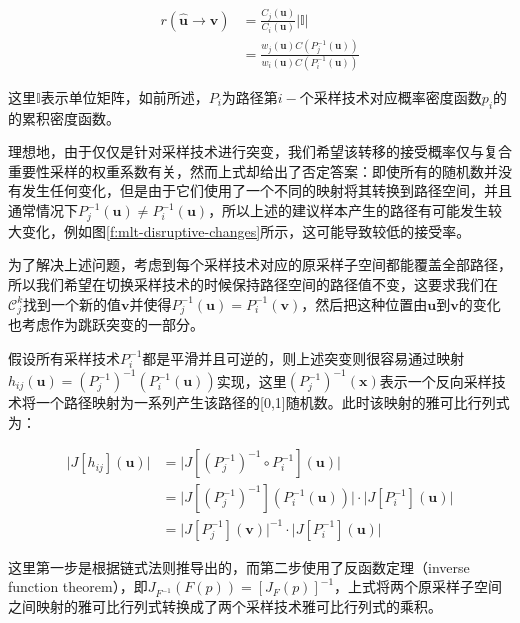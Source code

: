 \begin{equation}
\begin{aligned}
	r(\hat{\mathbf{u}}\to\hat{\mathbf{v}})&=\frac{C_j({\mathbf{u}})}{C_i({\mathbf{u}})}|\mathds{I}|\\
	&=\frac{w_j({\mathbf{u}})C(P^{-1}_j({\mathbf{u}}))}{w_i({\mathbf{u}})C(P^{-1}_i({\mathbf{u}}))}
\end{aligned}
\end{equation}

\noindent 这里$\mathds{I}$表示单位矩阵，如前所述，$P_i$为路径第$i-$个采样技术对应概率密度函数$p_i$的的累积密度函数。

理想地，由于仅仅是针对采样技术进行突变，我们希望该转移的接受概率仅与复合重要性采样的权重系数有关，然而上式却给出了否定答案：即使所有的随机数并没有发生任何变化，但是由于它们使用了一个不同的映射将其转换到路径空间，并且通常情况下$P^{-1}_j({\mathbf{u}})\neq P^{-1}_i({\mathbf{u}})$，所以上述的建议样本产生的路径有可能发生较大变化，例如图\ref{f:mlt-disruptive-changes}所示，这可能导致较低的接受率。

为了解决上述问题，考虑到每个采样技术对应的原采样子空间都能覆盖全部路径，所以我们希望在切换采样技术的时候保持路径空间的路径值不变，这要求我们在$\mathscr{C}^{k}_j$找到一个新的值${\mathbf{v}}$并使得$P^{-1}_j({\mathbf{u}})=P^{-1}_i({\mathbf{v}})$，然后把这种位置由${\mathbf{u}}$到${\mathbf{v}}$的变化也考虑作为跳跃突变的一部分。

假设所有采样技术$P^{-1}_i$都是平滑并且可逆的，则上述突变则很容易通过映射$h_{ij}({\mathbf{u}})=(P^{-1}_j)^{-1}(P^{-1}_i({\mathbf{u}}))$实现，这里$(P^{-1}_j)^{-1}({\mathbf{x}})$表示一个反向采样技术将一个路径映射为一系列产生该路径的[0,1]随机数。此时该映射的雅可比行列式为：

\begin{equation}
\begin{aligned}
	\big|J[h_{ij}]({\mathbf{u}})\big|&=\big|J[(P^{-1}_j)^{-1}\circ P^{-1}_i]({\mathbf{u}})\big|\\
	&=\big|J[(P^{-1}_j)^{-1}](P^{-1}_i({\mathbf{u}}))\big|\cdot\big|J[P^{-1}_i]({\mathbf{u}})\big|\\
	&=\big|J[P^{-1}_j]({\mathbf{v}})\big|^{-1}\cdot\big|J[P^{-1}_i]({\mathbf{u}})\big|
\end{aligned}
\end{equation}

\noindent 这里第一步是根据链式法则推导出的，而第二步使用了反函数定理（inverse function theorem），即$J_{F^{-1}}(F(p))=[J_F(p)]^{-1}$，上式将两个原采样子空间之间映射的雅可比行列式转换成了两个采样技术雅可比行列式的乘积。


